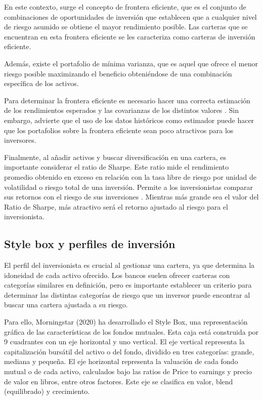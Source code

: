 \documentclass[a4paper,fleqn]{cas-sc}
\begin{document}
En este contexto, surge el concepto de frontera eficiente, que es el conjunto de combinaciones de oportunidades de inversión que establecen que a cualquier nivel de riesgo asumido se obtiene el mayor rendimiento posible. Las carteras que se encuentran en esta frontera eficiente se les caracteriza como carteras de inversión eficiente.

Además, existe el portafolio de mínima varianza, que es aquel que ofrece el menor riesgo posible maximizando el beneficio obteniéndose de una combinación específica de los activos.

Para determinar la frontera eficiente es necesario hacer una correcta estimación de los rendimientos esperados y las covarianzas de los distintos valores \cite{Zubeldia}. Sin embargo, \cite{Michaud} advierte que el uso de los datos históricos como estimador puede hacer que los portafolios sobre la frontera eficiente sean poco atractivos para los inversores.

Finalmente, al añadir activos y buscar diversificación en una cartera, es importante considerar el ratio de Sharpe. Este ratio mide el rendimiento promedio obtenido en exceso en relación con la tasa libre de riesgo por unidad de volatilidad o riesgo total de una inversión. Permite a los inversionistas comparar sus retornos con el riesgo de sus inversiones \cite{Sharpe}. Mientras más grande sea el valor del Ratio de Sharpe, más atractivo será el retorno ajustado al riesgo para el inversionista.

\subsection{Style box y perfiles de inversión}

El perfil del inversionista es crucial al gestionar una cartera, ya que determina la idoneidad de cada activo ofrecido. Los bancos suelen ofrecer carteras con categorías similares en definición, pero es importante establecer un criterio para determinar las distintas categorías de riesgo que un inversor puede encontrar al buscar una cartera ajustada a su riesgo.

Para ello, Morningstar (2020) ha desarrollado el Style Box, una representación gráfica de las características de los fondos mutuales. Esta caja está construida por 9 cuadrantes con un eje horizontal y uno vertical. El eje vertical representa la capitalización bursátil del activo o del fondo, dividido en tres categorías: grande, mediana y pequeña. El eje horizontal representa la valuación de cada fondo mutual o de cada activo, calculados bajo las ratios de Price to earnings y precio de valor en libros, entre otros factores. Este eje se clasifica en valor, blend (equilibrado) y crecimiento.
\end{document}
